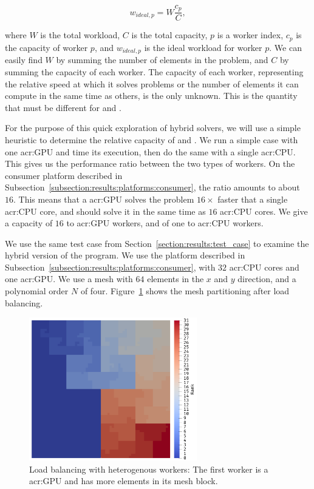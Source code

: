 \begin{equation}
    w_{ideal,p} = W \frac{c_p}{C},
\end{equation}

\noindent
where \(W\) is the total workload, \(C\) is the total capacity, \(p\) is a worker index, \(c_p\) is
the capacity of worker \(p\), and \(w_{ideal,p}\) is the ideal workload for worker \(p\). We can
easily find \(W\) by summing the number of elements in the problem, and \(C\) by summing the
capacity of each worker. The capacity of each worker, representing the relative speed at which it
solves problems or the number of elements it can compute in the same time as others, is the only
unknown. This is the quantity that must be different for  and
.

For the purpose of this quick exploration of hybrid solvers, we will use a simple heuristic to
determine the relative capacity of  and . We run a simple
case with one \acrshort{acr:GPU} and time its execution, then do the same with a single
\acrshort{acr:CPU}. This gives us the performance ratio between the two types of workers. On the
consumer platform described in Subsection~\ref{subsection:results:platforms:consumer}, the ratio
amounts to about \(16\). This means that a \acrshort{acr:GPU} solves the problem \(16 \times \)
faster that a single \acrshort{acr:CPU} core, and should solve it in the same time as \(16\)
\acrshort{acr:CPU} cores. We give a capacity of \(16\) to \acrshort{acr:GPU} workers, and of one to
\acrshort{acr:CPU} workers.

We use the same test case from Section~\ref{section:results:test_case} to examine the hybrid version
of the program. We use the platform described in
Subsection~\ref{subsection:results:platforms:consumer}, with \(32\) \acrshort{acr:CPU} cores and one
\acrshort{acr:GPU}. We use a mesh with \(64\) elements in the \(x\) and \(y\) direction, and a
polynomial order \(N\) of four. Figure~\ref{fig:hybrid_load_balancing} shows the mesh partitioning
after load balancing.

\begin{figure}[H]
    \centering
    \includegraphics[width=0.65\textwidth]{Chapter_hybrid_solver/media/cpu_gpu}
    \caption{Load balancing with heterogenous workers: The first worker is a \acrshort{acr:GPU} and has more elements in its mesh block.}\label{fig:hybrid_load_balancing}
\end{figure}

